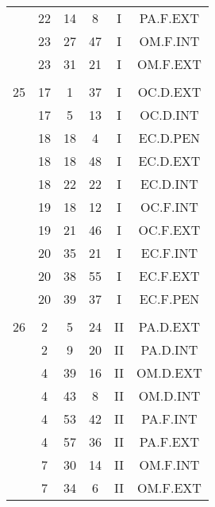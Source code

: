 \documentclass[12pt, a4paper]{article}
\begin{document}
\begin{multicols}{3}
{\begin{tabular}{c c c c c c}
	 	 	 	 & 22 & 14 & 8 & I & PA.F.EXT\\%
	 	 	 	 & 23 & 27 & 47 & I & OM.F.INT\\%
	 	 	 	 & 23 & 31 & 21 & I & OM.F.EXT\\%
	 	 	 	 & & & & & \\%
	 	 	 	25 & 17 & 1 & 37 & I & OC.D.EXT\\%
	 	 	 	 & 17 & 5 & 13 & I & OC.D.INT\\%
	 	 	 	 & 18 & 18 & 4 & I & EC.D.PEN\\%
	 	 	 	 & 18 & 18 & 48 & I & EC.D.EXT\\%
	 	 	 	 & 18 & 22 & 22 & I & EC.D.INT\\%
	 	 	 	 & 19 & 18 & 12 & I & OC.F.INT\\%
	 	 	 	 & 19 & 21 & 46 & I & OC.F.EXT\\%
	 	 	 	 & 20 & 35 & 21 & I & EC.F.INT\\%
	 	 	 	 & 20 & 38 & 55 & I & EC.F.EXT\\%
	 	 	 	 & 20 & 39 & 37 & I & EC.F.PEN\\%
	 	 	 	 & & & & & \\%
	 	 	 	26 & 2 & 5 & 24 & II & PA.D.EXT\\%
	 	 	 	 & 2 & 9 & 20 & II & PA.D.INT\\%
	 	 	 	 & 4 & 39 & 16 & II & OM.D.EXT\\%
	 	 	 	 & 4 & 43 & 8 & II & OM.D.INT\\%
	 	 	 	 & 4 & 53 & 42 & II & PA.F.INT\\%
	 	 	 	 & 4 & 57 & 36 & II & PA.F.EXT\\%
	 	 	 	 & 7 & 30 & 14 & II & OM.F.INT\\%
	 	 	 	 & 7 & 34 & 6 & II & OM.F.EXT\\%

\end{tabular}}
\end{multicols}
\end{document}
